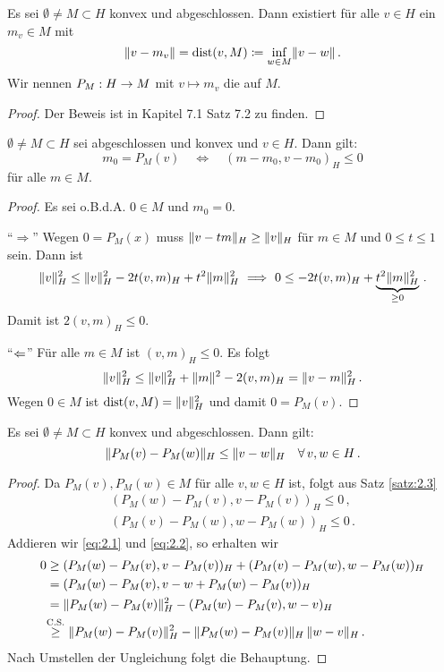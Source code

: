 \begin{satz}\label{satz:2.2}
Es sei $\emptyset\neq M\subset H$ konvex und abgeschlossen. Dann existiert für alle $v\in H$ ein $m_v\in M$ mit
\[ 
  	\lVert v-m_v\rVert=\operatorname{dist}(v,M)\coloneqq \inf_{w\in M}\lVert v-w\rVert\, .
\]
Wir nennen $P_M:H\rightarrow M$ mit $v\mapsto m_v$ die  auf $M$.
\end{satz}

\begin{proof}
Der Beweis ist in \cite{Walker} Kapitel 7.1 Satz 7.2 zu finden.
\end{proof}


\begin{satz}\label{satz:2.3}
$\emptyset\neq M\subset H$ sei abgeschlossen und konvex und $v\in H$. Dann gilt:
\[ 
  	m_0=P_M(v)\quad\Longleftrightarrow\quad (m-m_0, v-m_0)_H\leq0 
\]
für alle $m\in M$.
\end{satz}

\begin{proof}
 Es sei o.B.d.A. $0\in M$ und $m_0=0$.
 
  "`$\Rightarrow$"' Wegen $0=P_M(x)$ muss $\lVert v-tm\rVert_H\geq\lVert v\rVert_H$ für $m\in M$ und $0\leq t\leq1$ sein. Dann ist
\begin{align*}
    	 \lVert v\rVert^2_H\leq\lVert v\rVert^2_H-2t(v, m)_H+t^2\lVert m\rVert^2_H
	\ \Longrightarrow \ 0 \le - 2t (v,m)_H + \underbrace{t^2 \lVert m\rVert_H^2}_{\ge 0} \, .
 \end{align*}
Damit ist $2(v, m)_H\leq0$.
 
 "`$\Leftarrow$"' Für alle $m\in M$ ist $(v, m)_H\leq0$. Es folgt
\[ 
	\lVert v\rVert^2_H\leq\lVert v\rVert^2_H+\lVert m\rVert^2-2(v,m)_H=\lVert v-m\rVert^2_H\, . 
\]
Wegen $0\in M$ ist $\operatorname{dist}(v,M)=\lVert v\rVert^2_H$ und damit $0=P_M(v)$.
\end{proof}


\begin{satz}\label{satz:2.4}
Es sei $\emptyset \not = M \subset H$ konvex und abgeschlossen. Dann gilt:
\[
	\lVert P_M(v)-P_M(w)\rVert_H \le \lVert v-w\rVert_H \quad \forall \, v,w \in H \, .
\]
\end{satz}

\begin{proof}
Da $P_M(v), P_M(w) \in M$ für alle $v,w \in H$ ist, folgt aus Satz \ref{satz:2.3}
\begin{align}\label{eq:2.1}
	(P_M(w)-P_M(v),v-P_M(v))_H  \le 0 \, , \\
	(P_M(v)-P_M(w),w-P_M(w))_H \le 0 \, .\label{eq:2.2}
\end{align}
Addieren wir \eqref{eq:2.1} und \eqref{eq:2.2}, so erhalten wir
\begin{align*}
	0 &\ge (P_M(w)-P_M(v),v-P_M(v))_H + (P_M(v)-P_M(w),w-P_M(w))_H \\
	& = (P_M(w)-P_M(v),v-w+P_M(w)-P_M(v))_H \\
	& = \lVert P_M(w)-P_M(v)\rVert_H^2-(P_M(w)-P_M(v),w-v)_H \\
	&\!\!\!\: \stackrel{\scriptsize \text{C.S.}}\ge \lVert P_M(w)-P_M(v)\rVert_H^2 - \lVert P_M(w)-P_M(v)\rVert_H \, \lVert w-v\rVert_H \, .
\end{align*}
Nach Umstellen der Ungleichung folgt die Behauptung.
\end{proof}


